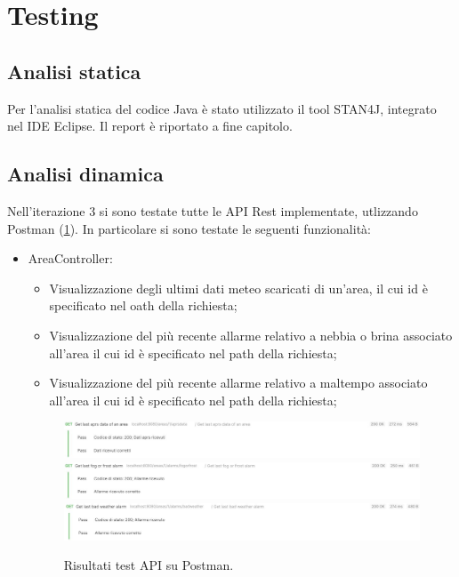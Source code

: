 \section{Testing}
\subsection{Analisi statica}
Per l'analisi statica del codice Java è stato utilizzato il tool STAN4J, integrato nel IDE Eclipse. Il report è riportato a fine capitolo.

\subsection{Analisi dinamica}
Nell'iterazione 3 si sono testate tutte le API Rest implementate, utlizzando Postman (\Fig \ref{fig:RisultatiTestAPIIT3}). In particolare si sono testate le seguenti funzionalità:

\begin{itemize}
	\item AreaController:
	\begin{itemize}
		\item Visualizzazione degli ultimi dati meteo scaricati di un'area, il cui id è specificato nel oath della richiesta;
		\item Visualizzazione del più recente allarme relativo a nebbia o brina associato all'area il cui id è specificato nel path della richiesta;
		\item Visualizzazione del più recente allarme relativo a maltempo associato all'area il cui id è specificato nel path della richiesta;
	\end{itemize}

	\begin{figure}[h!]
		\centering
		\includegraphics[width=1\linewidth]{./Iterazione 3/ImageFiles/TestGetAprsData}
		\includegraphics[width=1\linewidth]{./Iterazione 3/ImageFiles/TestGetFrostOrFogAlarm}
		\includegraphics[width=1\linewidth]{./Iterazione 3/ImageFiles/TestGetBadWeatherAlarm}		
		\caption{Risultati test API su Postman.}
		\label{fig:RisultatiTestAPIIT3}
	\end{figure}
\end{itemize}

